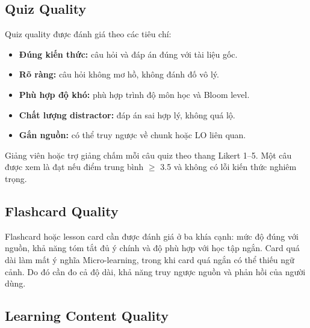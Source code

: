 \subsection{Quiz Quality}

Quiz quality được đánh giá theo các tiêu chí:
\begin{itemize}
    \item \textbf{Đúng kiến thức:} câu hỏi và đáp án đúng với tài liệu gốc.
    \item \textbf{Rõ ràng:} câu hỏi không mơ hồ, không đánh đố vô lý.
    \item \textbf{Phù hợp độ khó:} phù hợp trình độ môn học và Bloom level.
    \item \textbf{Chất lượng distractor:} đáp án sai hợp lý, không quá lộ.
    \item \textbf{Gắn nguồn:} có thể truy ngược về chunk hoặc LO liên quan.
\end{itemize}

Giảng viên hoặc trợ giảng chấm mỗi câu quiz theo thang Likert 1--5. Một câu
được xem là đạt nếu điểm trung bình $\geq$ 3.5 và không có lỗi kiến thức
nghiêm trọng.

\subsection{Flashcard Quality}

Flashcard hoặc lesson card cần được đánh giá ở ba khía cạnh: mức độ đúng với
nguồn, khả năng tóm tắt đủ ý chính và độ phù hợp với học tập ngắn. Card quá
dài làm mất ý nghĩa Micro-learning, trong khi card quá ngắn có thể thiếu ngữ
cảnh. Do đó cần đo cả độ dài, khả năng truy ngược nguồn và phản hồi của người
dùng.

\subsection{Learning Content Quality}

